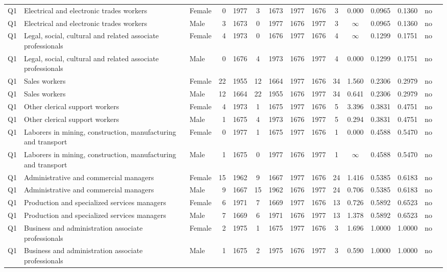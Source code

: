 \begin{longtable}{lllrcccccccccll}
Q1 & Electrical and electronic trades workers & Female & 0 & 1977 & 3 & 1673 & 1977 & 1676 & 3 & 0.000 & 0.0965 & 0.1360 & no \\
Q1 & Electrical and electronic trades workers & Male & 3 & 1673 & 0 & 1977 & 1676 & 1977 & 3 & $\infty$ & 0.0965 & 0.1360 & no \\
Q1 & Legal, social, cultural and related associate professionals & Female & 4 & 1973 & 0 & 1676 & 1977 & 1676 & 4 & $\infty$ & 0.1299 & 0.1751 & no \\
Q1 & Legal, social, cultural and related associate professionals & Male & 0 & 1676 & 4 & 1973 & 1676 & 1977 & 4 & 0.000 & 0.1299 & 0.1751 & no \\
Q1 & Sales workers & Female & 22 & 1955 & 12 & 1664 & 1977 & 1676 & 34 & 1.560 & 0.2306 & 0.2979 & no \\
Q1 & Sales workers & Male & 12 & 1664 & 22 & 1955 & 1676 & 1977 & 34 & 0.641 & 0.2306 & 0.2979 & no \\
Q1 & Other clerical support workers & Female & 4 & 1973 & 1 & 1675 & 1977 & 1676 & 5 & 3.396 & 0.3831 & 0.4751 & no \\
Q1 & Other clerical support workers & Male & 1 & 1675 & 4 & 1973 & 1676 & 1977 & 5 & 0.294 & 0.3831 & 0.4751 & no \\
Q1 & Laborers in mining, construction, manufacturing and transport & Female & 0 & 1977 & 1 & 1675 & 1977 & 1676 & 1 & 0.000 & 0.4588 & 0.5470 & no \\
Q1 & Laborers in mining, construction, manufacturing and transport & Male & 1 & 1675 & 0 & 1977 & 1676 & 1977 & 1 & $\infty$ & 0.4588 & 0.5470 & no \\
Q1 & Administrative and commercial managers & Female & 15 & 1962 & 9 & 1667 & 1977 & 1676 & 24 & 1.416 & 0.5385 & 0.6183 & no \\
Q1 & Administrative and commercial managers & Male & 9 & 1667 & 15 & 1962 & 1676 & 1977 & 24 & 0.706 & 0.5385 & 0.6183 & no \\
Q1 & Production and specialized services managers & Female & 6 & 1971 & 7 & 1669 & 1977 & 1676 & 13 & 0.726 & 0.5892 & 0.6523 & no \\
Q1 & Production and specialized services managers & Male & 7 & 1669 & 6 & 1971 & 1676 & 1977 & 13 & 1.378 & 0.5892 & 0.6523 & no \\
Q1 & Business and administration associate professionals & Female & 2 & 1975 & 1 & 1675 & 1977 & 1676 & 3 & 1.696 & 1.0000 & 1.0000 & no \\
Q1 & Business and administration associate professionals & Male & 1 & 1675 & 2 & 1975 & 1676 & 1977 & 3 & 0.590 & 1.0000 & 1.0000 & no \\

\end{longtable}

